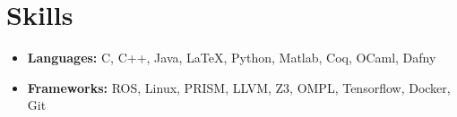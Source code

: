 \section{Skills}

\begin{itemize}
    \item[] \textbf{Languages:} C, C++, Java, \LaTeX, Python, Matlab, Coq, OCaml, Dafny
    \vspace{1em}
    \item[] \textbf{Frameworks:} ROS, Linux, PRISM, LLVM, Z3, OMPL, Tensorflow, Docker, Git
\end{itemize}
